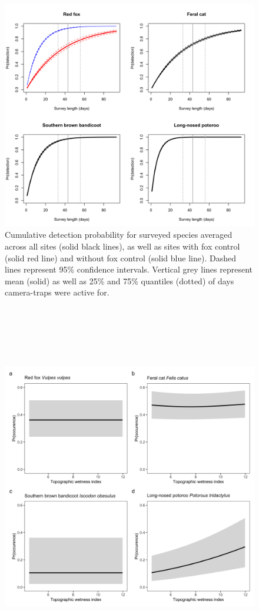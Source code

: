 \documentclass[11pt,a4paper,titlepage,twoside,openright]{style/unimelbthesis}
\begin{document}
\begin{mainmatter}
\begin{figure}
{\centering \includegraphics[width=1\linewidth]{figure/c1/detectability} 

}

\caption{Cumulative detection probability for surveyed species averaged across all sites (solid black lines), as well as sites with fox control (solid red line) and without fox control (solid blue line). Dashed lines represent 95\% confidence intervals. Vertical grey lines represent mean (solid) as well as 25\% and 75\% quantiles (dotted) of days camera-traps were active for.}\label{fig:occ-det-prob}
\end{figure}
\newpage

\(~\)

\(~\)

\(~\)
\begin{figure}

{\centering \includegraphics[width=1\linewidth]{figure/c1/twi} 

}
\end{figure}
\end{mainmatter}
\end{document}
